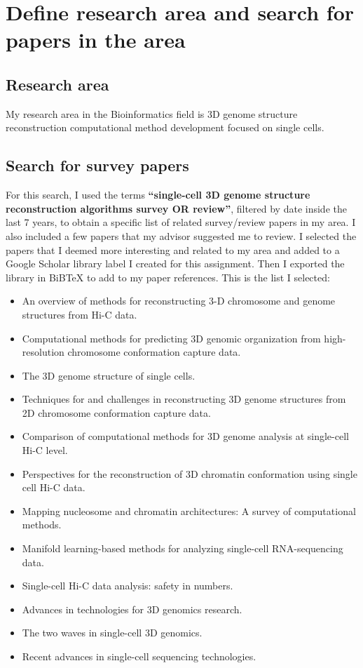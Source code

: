 \section{Define research area and search for papers in the area}

\subsection{Research area}
My research area in the Bioinformatics field is 3D genome structure reconstruction computational method development focused on single cells.

\subsection{Search for survey papers}
For this search, I used the terms \textbf{``single-cell 3D genome structure reconstruction algorithms survey OR review''}, filtered by date inside the last 7 years, to obtain a specific list of related survey/review papers in my area. I also included a few papers that my advisor suggested me to review. I selected the papers that I deemed more interesting and related to my area and added to a Google Scholar library label I created for this assignment. Then I exported the library in BiBTeX to add to my paper references. This is the list I selected:
\begin{itemize}
    \item \cite{oluwadare2019overview} An overview of methods for reconstructing 3-D chromosome and genome structures from Hi-C data.
    \item \cite{mackay2020computational} Computational methods for predicting 3D genomic organization from high-resolution chromosome conformation capture data.
    \item \cite{zhou20213d} The 3D genome structure of single cells.
    \item \cite{li2023techniques} Techniques for and challenges in reconstructing 3D genome structures from 2D chromosome conformation capture data.
    \item \cite{li2020comparison} Comparison of computational methods for 3D genome analysis at single-cell Hi-C level.
    \item \cite{kos2021perspectives} Perspectives for the reconstruction of 3D chromatin conformation using single cell Hi-C data.
    \item \cite{fang2022mapping} Mapping nucleosome and chromatin architectures: A survey of computational methods.
    \item \cite{moon2018manifold} Manifold learning-based methods for analyzing single-cell RNA-sequencing data.
    \item \cite{galitsyna2021single} Single-cell Hi-C data analysis: safety in numbers.
    \item \cite{zhang2020advances} Advances in technologies for 3D genomics research.
    \item \cite{ulianov2022two} The two waves in single-cell 3D genomics.
    \item \cite{wen2022recent} Recent advances in single-cell sequencing technologies.
\end{itemize}

